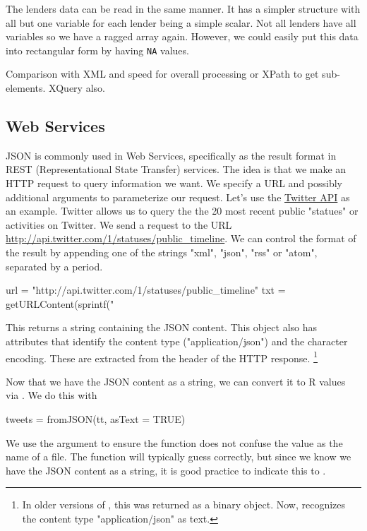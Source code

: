 \documentclass[article]{jss}
\def\hyperlabel#1{}
\begin{document}
The lenders data can be read in the same manner. It has a simpler
structure with all but one variable for each lender
being a simple scalar. Not all lenders have all variables so
we have a ragged array again. However, we could easily put this
data into rectangular form by having \texttt{NA} values.

Comparison with XML and speed for overall processing
or XPath to get sub-elements.
XQuery also.

\subsection{Web Services}
\label{WebServices}\hyperlabel{WebServices}%

JSON is commonly used in Web Services,
specifically as the result format
in REST (Representational State Transfer) services.
The idea is that we make an HTTP request to query 
information we want.
We specify a URL and possibly additional arguments
to parameterize our request.
Let's use the \href{https://dev.twitter.com/docs/api}{Twitter API}
as an example.
Twitter allows us to query the  the 20 most recent public "statues" or activities
on Twitter.
We send a request to the URL 
\url{http://api.twitter.com/1/statuses/public_timeline}.
We can control the format of the result by appending
one of the strings "xml", "json", "rss" or "atom",
separated by a period.
\begin{CodeChunk}
\begin{CodeInput}
url = "http://api.twitter.com/1/statuses/public_timeline"
txt = getURLContent(sprintf("%
\end{CodeInput}
\end{CodeChunk}
This returns a string containing the JSON content.
This object also has attributes that identify
the content type ("application/json")
and the character encoding. These are extracted from the 
header of the HTTP response.
\footnote{
In older versions of , this was returned
as a binary object. Now,  recognizes 
the content type "application/json" as text.
}

Now that we have the JSON content as a string, we can convert it to 
R values via .
We do this with
\begin{CodeChunk}
\begin{CodeInput}
tweets = fromJSON(tt, asText = TRUE)
\end{CodeInput}
\end{CodeChunk}
We use the  argument
to ensure the function does not confuse the 
value as the name of a file.  The function
will typically guess correctly, but since we know
we have the JSON content as a string, it is
good practice to indicate this to .
\end{document}
